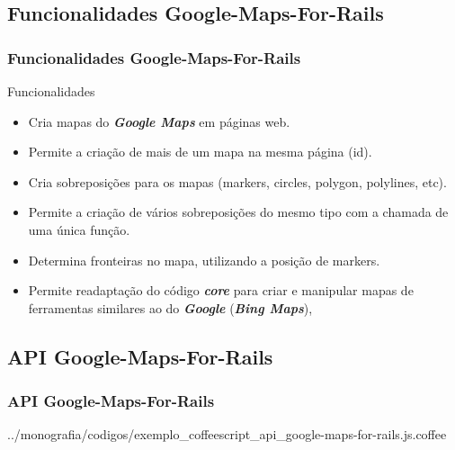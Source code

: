 \subsection{Funcionalidades Google-Maps-For-Rails}
\begin{frame}
 \frametitle{Funcionalidades Google-Maps-For-Rails}

  \begin{block}{Funcionalidades}   

   \begin{itemize}

    \item  Cria mapas do \emph{\textbf{Google Maps}} em páginas web.

    \item  Permite a criação de mais de um mapa na mesma página (id).

    \item  Cria sobreposições para os mapas (markers, circles, polygon, polylines, etc).

    \item  Permite a criação de vários sobreposições do mesmo tipo com a chamada de uma única função.

    \item  Determina fronteiras no mapa, utilizando a posição de markers.

    \item  Permite readaptação do código \emph{\textbf{core}} para criar e manipular mapas de ferramentas
    similares ao do \emph{\textbf{Google}} (\emph{\textbf{Bing Maps}}),

   \end{itemize}

  \end{block}

\end{frame}


\subsection{API Google-Maps-For-Rails}
\begin{frame}
 \frametitle{API Google-Maps-For-Rails}

      
      {../monografia/codigos/exemplo_coffeescript_api_google-maps-for-rails.js.coffee}

\end{frame}


